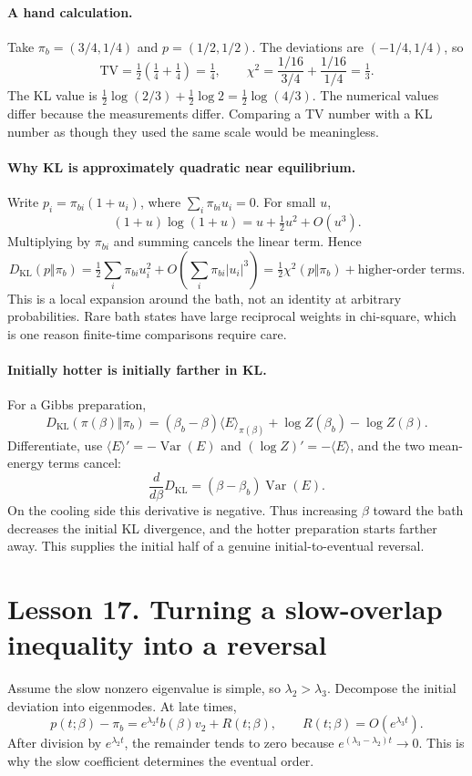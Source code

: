 \documentclass[11pt]{article}
\newcommand{\Var}{\operatorname{Var}}
\begin{document}
\paragraph{A hand calculation.}
Take $\pi_b=(3/4,1/4)$ and $p=(1/2,1/2)$. The deviations are
$(-1/4,1/4)$, so
\[
\mathrm{TV}=\tfrac12(\tfrac14+\tfrac14)=\tfrac14,
\qquad
\chi^2=\frac{1/16}{3/4}+\frac{1/16}{1/4}=\tfrac13.
\]
The KL value is
$\frac12\log(2/3)+\frac12\log2=\frac12\log(4/3)$.
The numerical values differ because the measurements differ. Comparing a TV
number with a KL number as though they used the same scale would be meaningless.

\paragraph{Why KL is approximately quadratic near equilibrium.}
Write $p_i=\pi_{bi}(1+u_i)$, where $\sum_i\pi_{bi}u_i=0$.
For small $u$,
\[
(1+u)\log(1+u)=u+\tfrac12u^2+O(u^3).
\]
Multiplying by $\pi_{bi}$ and summing cancels the linear term. Hence
\[
D_{\mathrm{KL}}(p\Vert\pi_b)
=\tfrac12\sum_i\pi_{bi}u_i^2+O\!\left(\sum_i\pi_{bi}|u_i|^3\right)
=\tfrac12\chi^2(p\Vert\pi_b)+\text{higher-order terms}.
\]
This is a local expansion around the bath, not an identity at arbitrary
probabilities. Rare bath states have large reciprocal weights in chi-square,
which is one reason finite-time comparisons require care.

\paragraph{Initially hotter is initially farther in KL.}
For a Gibbs preparation,
\[
D_{\mathrm{KL}}(\pi(\beta)\Vert\pi_b)
=(\beta_b-\beta)\langle E\rangle_{\pi(\beta)}
+\log Z(\beta_b)-\log Z(\beta).
\]
Differentiate, use $\langle E\rangle'=-\Var(E)$ and
$(\log Z)'=-\langle E\rangle$, and the two mean-energy terms cancel:
\[
\frac{d}{d\beta}D_{\mathrm{KL}}=(\beta-\beta_b)\Var(E).
\]
On the cooling side this derivative is negative. Thus increasing $\beta$
toward the bath decreases the initial KL divergence, and the hotter
preparation starts farther away. This supplies the initial half of a genuine
initial-to-eventual reversal.

\clearpage
\section*{Lesson 17. Turning a slow-overlap inequality into a reversal}
Assume the slow nonzero eigenvalue is simple, so
$\lambda_2>\lambda_3$. Decompose the initial deviation into eigenmodes.
At late times,
\[
p(t;\beta)-\pi_b=e^{\lambda_2t}b(\beta)v_2+R(t;\beta),
\qquad R(t;\beta)=O(e^{\lambda_3t}).
\]
After division by $e^{\lambda_2t}$, the remainder tends to zero because
$e^{(\lambda_3-\lambda_2)t}\to0$. This is why the slow coefficient determines
the eventual order.
\end{document}
